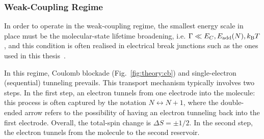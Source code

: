 \subsubsection{Weak-Coupling Regime}\label{ch:theory:sec:weak_limit}
In order to operate in the weak-coupling regime, the smallest energy scale in place must be the molecular-state lifetime broadening, i.e. $\Gamma\ll\E_C, E_\textrm{add}(N), k_\textrm{B}T$, and this condition is often realised in electrical break junctions such as the ones used in this thesis~\cite{gehring2019single}.

In this regime, Coulomb blockade (Fig.~\ref{fig:theory:cb}) and single-electron (sequential) tunneling prevails. This transport mechanism typically involves two steps. In the first step, an electron tunnels from one electrode into the molecule: this process is often captured by the notation $N\leftrightarrow N+1$, where the double-ended arrow refers to the possibility of having an electron tunneling back into the first electrode. Overall, the total-spin change is $\Delta S = \pm 1 / 2$. In the second step, the electron tunnels from the molecule to the second reservoir.

